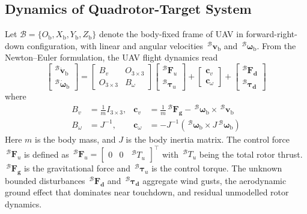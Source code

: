 \subsection{Dynamics of Quadrotor-Target System} \label{quadrotor dynamics: section}
Let $\mathcal{B}=\{O_{\text{b}},X_{\text{b}},Y_{\text{b}},Z_{\text{b}}\}$ denote the body-fixed frame of UAV in forward-right-down configuration, with linear and angular velocities $\,^\mathcal{B}\boldsymbol{v}_\text{b}$ and $\,^\mathcal{B}\boldsymbol{\omega}_\text{b}$. From the Newton--Euler formulation, the UAV flight dynamics read
\begin{equation}
\label{quadrotor dynamics: equation}
    \begin{bmatrix} ^\mathcal{B} \dot{\boldsymbol{v}}_{\text{b}} \\ ^\mathcal{B} \dot{\boldsymbol{\omega}}_{\text{b}} \end{bmatrix} = \begin{bmatrix} B_v & O_{3 \times 3} \\ O_{3 \times 3} & B_{\omega} \end{bmatrix} \begin{bmatrix} ^\mathcal{B} \boldsymbol{F}_u \\ ^\mathcal{B} \boldsymbol{\tau}_u \end{bmatrix} + \begin{bmatrix} \boldsymbol{c}_v \\ \boldsymbol{c}_{\omega} \end{bmatrix} + \begin{bmatrix} ^\mathcal{B} \boldsymbol{F_{\text{d}}} \\ ^\mathcal{B} \boldsymbol{\tau_{\text{d}}} \end{bmatrix}
 \end{equation}
 where
 \begin{align*}
     B_v &= \frac{1}{m} I_{3 \times 3}, & \boldsymbol{c}_v &= \frac{1}{m} \,^\mathcal{B} \boldsymbol{F_{\text{g}}} - \,^\mathcal{B} \boldsymbol{\omega}_{\text{b}} \times \,^\mathcal{B} \boldsymbol{v}_{\text{b}} \\ B_{\omega} &= J^{-1}, & \boldsymbol{c}_{\omega} &= - J^{-1}\left(\,^\mathcal{B} \boldsymbol{\omega}_{\text{b}} \times J \,^\mathcal{B} \boldsymbol{\omega}_{\text{b}} \right)
 \end{align*}
Here $m$ is the body mass, and $J$ is the body inertia matrix. The control force $\,^\mathcal{B} \boldsymbol{F}_u$ is defined as $\,^\mathcal{B} \boldsymbol{F}_u = \begin{bmatrix} 0 & 0 & \,^\mathcal{B} T_u\end{bmatrix}^\top $ with $\,^\mathcal{B} T_u$ being the total rotor thrust. $\,^\mathcal{B} \boldsymbol{F_{\text{g}}}$ is the gravitational force and $\,^\mathcal{B} \boldsymbol{\tau}_u$ is the control torque. The unknown bounded disturbances $\,^\mathcal{B} \boldsymbol{F_{\text{d}}}$ and $\,^\mathcal{B} \boldsymbol{\tau_{\text{d}}}$ aggregate wind gusts, the aerodynamic ground effect \cite{sanchez-cuevas2017} that dominates near touchdown, and residual unmodelled rotor dynamics.

